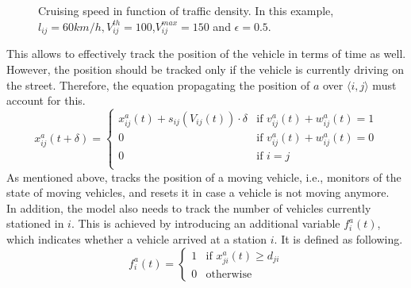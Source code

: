 \begin{figure}[t]
	\centering
	\caption[Cruising speed in function of traffic density]{Cruising speed in function of traffic density. In this example, $l_{ij} = 60 km/h,V_{ij}^{th} = 100$,$V_{ij}^{max} = 150$ and $\epsilon = 0.5$. }
	\label{fig:speed_model}
\end{figure}
This allows to effectively track the position of the vehicle in terms of time as well. However, the position should be tracked only if the vehicle is currently driving on the street. Therefore, the equation propagating the position of $a$ over $\langle i,j\rangle$ must account for this.
\begin{equation}
	x^a_{ij}(t+\delta) =\begin{cases}
		 x^a_{ij}(t) + s_{ij}(V_{ij}(t))\cdot\delta & \text{if } v^a_{ij}(t) + w^a_{ij}(t)= 1 \\
		 
		 0& \text{if } v^a_{ij}(t) + w^a_{ij}(t)= 0\\
		 0& \text{if }i=j \\
	\end{cases}
	 \label{eq:position_propagation}
\end{equation}
As mentioned above,  tracks the position of a moving vehicle, i.e., monitors of the state of moving vehicles, and resets it in case a vehicle is not moving anymore.\\
 In addition, the model also needs to track the number of vehicles currently stationed in $i$. This is achieved by introducing an additional variable $f^a_i(t)$, which indicates whether a vehicle arrived at a station $i$. It is defined as following.
\begin{equation}
	f^a_{i}(t) =\begin{cases}
		1 & \text{if }x^a_{ji}(t) \ge d_{ji}\\
		0 & \text{otherwise}
	\end{cases}
	\label{eq:station_propagation}
\end{equation}
